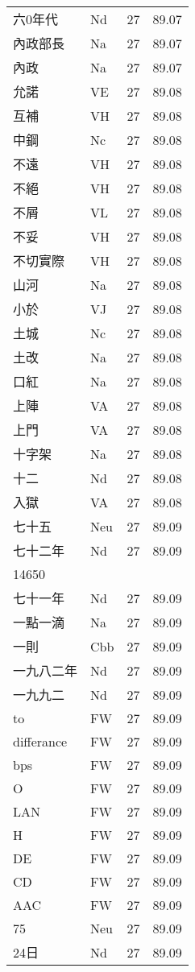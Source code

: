 \documentclass[twocolumn]{book}
\begin{document}
\begin{supertabular}{llrr}
六0年代 & Nd & 27 &  89.07\\
內政部長 & Na & 27 &  89.07\\
內政 & Na & 27 &  89.07\\
允諾 & VE & 27 &  89.08\\
互補 & VH & 27 &  89.08\\
中鋼 & Nc & 27 &  89.08\\
不遠 & VH & 27 &  89.08\\
不絕 & VH & 27 &  89.08\\
不屑 & VL & 27 &  89.08\\
不妥 & VH & 27 &  89.08\\
不切實際 & VH & 27 &  89.08\\
山河 & Na & 27 &  89.08\\
小於 & VJ & 27 &  89.08\\
土城 & Nc & 27 &  89.08\\
土改 & Na & 27 &  89.08\\
口紅 & Na & 27 &  89.08\\
上陣 & VA & 27 &  89.08\\
上門 & VA & 27 &  89.08\\
十字架 & Na & 27 &  89.08\\
十二 & Nd & 27 &  89.08\\
入獄 & VA & 27 &  89.08\\
七十五 & Neu & 27 &  89.09\\
七十二年 & Nd & 27 &  89.09\\
14650\\
七十一年 & Nd & 27 &  89.09\\
一點一滴 & Na & 27 &  89.09\\
一則 & Cbb & 27 &  89.09\\
一九八二年 & Nd & 27 &  89.09\\
一九九二 & Nd & 27 &  89.09\\
to & FW & 27 &  89.09\\
differance & FW & 27 &  89.09\\
bps & FW & 27 &  89.09\\
O & FW & 27 &  89.09\\
LAN & FW & 27 &  89.09\\
H & FW & 27 &  89.09\\
DE & FW & 27 &  89.09\\
CD & FW & 27 &  89.09\\
AAC & FW & 27 &  89.09\\
75 & Neu & 27 &  89.09\\
24日 & Nd & 27 &  89.09\\

\end{supertabular}
\end{document}

